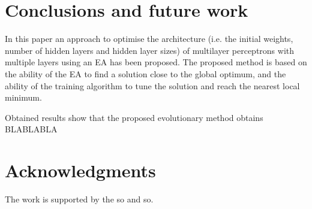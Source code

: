 \documentclass[runningheads]{llncs}
\begin{document}
\section{Conclusions and future work}
\label{sec:conclus}

In this paper an approach to optimise the architecture (i.e. the initial weights, number of hidden layers and hidden layer sizes) of multilayer perceptrons with multiple layers using an EA has been proposed. %
The proposed method is based on the ability of the EA to find a solution close to the global optimum, and the ability of the training algorithm to tune the solution and reach the nearest local minimum.

Obtained results show that the proposed evolutionary method obtains BLABLABLA %


\section*{Acknowledgments}

The work is
supported by the so and so.



 
\end{document}
